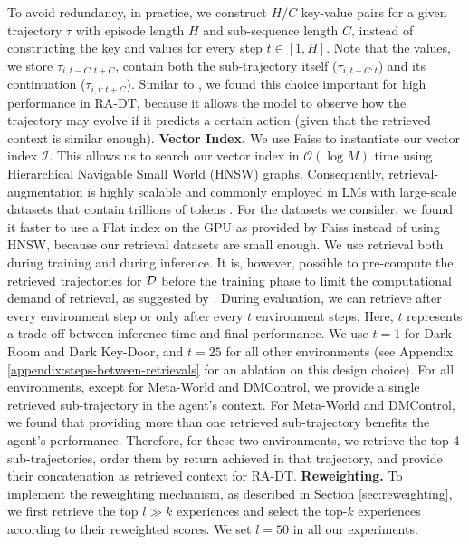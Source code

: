 \documentclass{article}
\newcommand{\cI}{\mathcal{I}} \newcommand{\cJ}{\mathcal{J}}
\begin{document}
To avoid redundancy, in practice, we construct $H / C$ key-value pairs for a given trajectory $\tau$ with episode length $H$ and sub-sequence length $C$, instead of constructing the key and values for every step $t \in [1,H]$.
Note that the values, we store $\tau_{i, t-C:t+C}$, contain both the sub-trajectory itself ($\tau_{i, t-C:t}$) and its continuation ($\tau_{i, t:t+C}$).
Similar to \citet{Borgeaud:22}, we found this choice important for high performance in RA-DT, because it allows the model to observe how the trajectory may evolve if it predicts a certain action (given that the retrieved context is similar enough).
\textbf{Vector Index.} We use Faiss \citep{Johnson:2019,Douze:2024} to instantiate our vector index $\cI$.
This allows us to search our vector index in $\mathcal{O}(\log M)$ time using Hierarchical Navigable Small World (HNSW) graphs.
Consequently, retrieval-augmentation is highly scalable and commonly employed in LMs with large-scale datasets that contain trillions of tokens \citep{Borgeaud:22}.
For the datasets we consider, we found it faster to use a Flat index on the GPU as provided by Faiss instead of using HNSW, because our retrieval datasets are small enough.
We use retrieval both during training and during inference.
It is, however, possible to pre-compute the retrieved trajectories for $\mathcal{D}$ before the training phase to limit the computational demand of retrieval, as suggested by \citet{Borgeaud:22}.
During evaluation, we can retrieve after every environment step or only after every $t$ environment steps.
Here, $t$ represents a trade-off between inference time and final performance.
We use $t=1$ for Dark-Room and Dark Key-Door, and $t=25$ for all other environments (see Appendix \ref{appendix:steps-between-retrievals} for an ablation on this design choice).
For all environments, except for Meta-World and DMControl, we provide a single retrieved sub-trajectory in the agent's context.
For Meta-World and DMControl, we found that providing more than one retrieved sub-trajectory benefits the agent's performance.
Therefore, for these two environments, we retrieve the top-4 sub-trajectories, order them by return achieved in that trajectory, and provide their concatenation as retrieved context for RA-DT.
\textbf{Reweighting.}
To implement the reweighting mechanism, as described in Section \ref{sec:reweighting}, we first retrieve the top $l\gg k$ experiences and select the top-$k$ experiences according to their reweighted scores.
We set $l=50$ in all our experiments.
\end{document}
